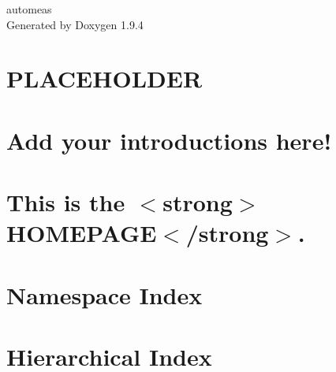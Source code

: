 \documentclass[twoside]{book}
\newcommand{\+}{\discretionary{\mbox{\scriptsize$\hookleftarrow$}}{}{}}
\newcommand{\clearemptydoublepage}{%
    \newpage{\pagestyle{empty}\cleardoublepage}%
  }
\begin{document}
  \raggedbottom
    \hypersetup{pageanchor=false,
                bookmarksnumbered=true,
                pdfencoding=unicode
               }
  \begin{titlepage}
  \vspace*{7cm}
  \begin{center}%
  {\Large automeas}\\
  \vspace*{1cm}
  {\large Generated by Doxygen 1.9.4}\\
  \end{center}
  \end{titlepage}
  \clearemptydoublepage
  \tableofcontents
  \clearemptydoublepage
  \hypersetup{pageanchor=true}
\chapter{PLACEHOLDER}
\label{md__c___users__admin_source_repos_automeas_automeas_ui_api_index}

\chapter{Add your introductions here!}
\label{md__c___users__admin_source_repos_automeas_automeas_ui_articles_intro}

\chapter{This is the \texorpdfstring{$<$}{<}strong\texorpdfstring{$>$}{>}HOMEPAGE\texorpdfstring{$<$}{<}/strong\texorpdfstring{$>$}{>}.}
\label{md__c___users__admin_source_repos_automeas_automeas_ui_index}

\chapter{Namespace Index}

\chapter{Hierarchical Index}

\end{document}
